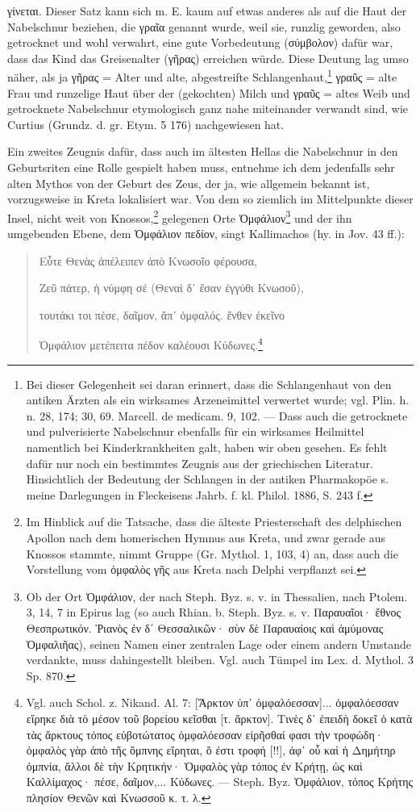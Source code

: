 \documentclass[a4paper, 11pt, oneside]{article}
\begin{document}
γίνεται. Dieser Satz kann sich m. E. kaum auf etwas anderes als auf die Haut der Nabelschnur beziehen, die γραῖα genannt wurde, weil sie, runzlig geworden, also getrocknet und wohl verwahrt, eine gute Vorbedeutung (σύμβολον) dafür war, dass das Kind das Greisenalter (γῆρας) erreichen würde. Diese Deutung lag umso näher, als ja γῆρας = Alter und alte, abgestreifte Schlangenhaut,\footnote{Bei dieser Gelegenheit sei daran erinnert, dass die Schlangenhaut von den antiken Ärzten als ein wirksames Arzeneimittel verwertet wurde; vgl. Plin. h. n. 28, 174; 30, 69. Marcell. de medicam. 9, 102. --- Dass auch die getrocknete und pulverisierte Nabelschnur ebenfalls für ein wirksames Heilmittel namentlich bei Kinderkrankheiten galt, haben wir oben gesehen. Es fehlt dafür nur noch ein bestimmtes Zeugnis aus der griechischen Literatur. Hinsichtlich der Bedeutung der Schlangen in der antiken Pharmakopöe s. meine Darlegungen in Fleckeisens Jahrb. f. kl. Philol. 1886, S. 243 f.} γραῦς = alte Frau und runzelige Haut über der (gekochten) Milch und γραῦς = altes Weib und getrocknete Nabelschnur etymologisch ganz nahe miteinander verwandt sind, wie Curtius (Grundz. d. gr. Etym. 5 176) nachgewiesen hat.

Ein zweites Zeugnis dafür, dass auch im ältesten Hellas die Nabelschnur in den Geburtsriten eine Rolle gespielt haben muss, entnehme ich dem jedenfalls sehr alten Mythos von der Geburt des Zeus, der ja, wie allgemein bekannt ist, vorzugsweise in Kreta lokalisiert war. Von dem so ziemlich im Mittelpunkte dieser Insel, nicht weit von Knossos,\footnote{Im Hinblick auf die Tatsache, dass die älteste Priesterschaft des delphischen Apollon nach dem homerischen Hymnus aus Kreta, und zwar gerade aus Knossos stammte, nimmt Gruppe (Gr. Mythol. 1, 103, 4) an, dass auch die Vorstellung vom ὀμφαλὸς γῆς aus Kreta nach Delphi verpflanzt sei.} gelegenen Orte Ὀμφάλιον\footnote{Ob der Ort Ὀμφάλιον, der nach Steph. Byz. s. v. in Thessalien, nach Ptolem. 3, 14, 7 in Epirus lag (so auch Rhian. b. Steph. Byz. s. v. Παραυαῖοι· ἔθνος Θεσπρωτικόν. Ῥιανὸς ἐν δ΄ Θεσσαλικῶν· σὺν δὲ Παραυαίοις καὶ ἀμύμονας Ὀμφαλιῆας), seinen Namen einer zentralen Lage oder einem andern Umstande verdankte, muss dahingestellt bleiben. Vgl. auch Tümpel im Lex. d. Mythol. 3 Sp. 870.} und der ihn umgebenden Ebene, dem Ὀμφάλιον πεδίον, singt Kallimachos (hy. in Jov. 43 ff.):
\begin{quotation}
Εὗτε Θενὰς ἀπέλειπεν ἀπὸ Κνωσοῖο φέρουσα,  

Ζεῦ πάτερ, ἡ νύμφη σέ (Θεναὶ δ᾽ ἔσαν ἐγγύθι Κνωσοῦ),


τουτάκι τοι πέσε, δαῖμον, ἄπ᾽ ὀμφαλός. ἔνθεν ἐκεῖνο

Ὀμφάλιον μετέπειτα πέδον καλέουσι Κύδωνες.\footnote{Vgl. auch Schol. z. Nikand. Al. 7:  [Ἄρκτον ὑπ᾽ ὀμφαλόεσσαν]... ὀμφαλόεσσαν εἴρηκε διὰ τὸ μέσον τοῦ βορείου κεῖσθαι [τ. ἄρκτον]. Τινὲς δ᾽ ἐπειδὴ δοκεῖ ὁ κατὰ τὰς ἄρκτους τόπος εὐβοτώτατος ὀμφαλόεσσαν εἰρῆσθαί φασι τὴν τροφώδη· ὀμφαλὸς γὰρ ἀπὸ τῆς ὄμπνης εἴρηται, ὅ ἐστι τροφή [!!], ἀφ᾽ οὗ καὶ ἡ Δημήτηρ ὀμπνία, ἄλλοι δὲ τὴν Κρητικήν· Ὀμφαλὸς γὰρ τόπος ἐν Κρήτῃ, ὡς καὶ Καλλίμαχος· πέσε, δαῖμον,... Κύδωνες. --- Steph. Byz. Ὀμφάλιον, τόπος Κρήτης πλησίον Θενῶν καὶ Κνωσσοῦ κ. τ. λ.}
\end{quotation}
\end{document}
